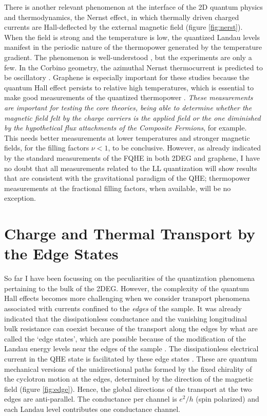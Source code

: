 \documentclass[aps,preprint,12pt,tightenlines]{revtex4}%
\begin{document}
There is another relevant phenomenon at the interface of the 2D quantum
physics and thermodynamics, the Nernst effect, in which thermally driven
charged currents are Hall-deflected by the external magnetic field (figure \ref{fig:nerst}). When the
field is strong and the temperature is low, the quantized Landau levels
manifest in the periodic nature of the thermopower generated by the
temperature gradient. The phenomenon is well-understood \cite{Girvin-Nernst},
but the experiments are only a few. In the Corbino geometry, the azimuthal
Nernst thermocurrent is predicted to be oscillatory \cite{Alt-PNAS}. Graphene
is especially important for these studies because the quantum Hall effect
persists to relative high temperatures, which is essential to make good
measurements of the quantized thermopower \cite{Zuev-graph,Wei-graph}.
\emph{These measurements are important for testing the core theories, being
able to determine whether the magnetic field felt by the charge carriers is
the applied field or the one diminished by the hypothetical flux attachments
of the Composite Fermions}, for example. This needs better measurements at
lower temperatures and stronger magnetic fields, for the filling factors
$\nu<1$, to be conclusive. However, as already indicated by the standard
measurements of the FQHE in both 2DEG and graphene, I have no doubt that all
measurements related to the LL quantization will show results that
are consistent with the gravitational paradigm of the QHE; thermopower
measurements at the fractional filling factors, when available, will be no exception.

\section{Charge and Thermal Transport by the Edge States}

So far I have been focussing on the peculiarities of the quantization
phenomena pertaining to the bulk of the 2DEG. However, the complexity of the
quantum Hall effects becomes more challenging when we consider transport
phenomena associated with currents confined to the \emph{edges} of the sample.
It was already indicated that the dissipationless conductance and the
vanishing longitudinal bulk resistance can coexist because of the transport
along the edges by what are called the `edge states', which are possible
because of the modification of the Landau energy levels near the edges of the
sample \cite{Halperin-edge}.  The dissipationless electrical current in the
QHE state is facilitated by these edge states \cite{Kane-edge}. These are
quantum mechanical versions of the unidirectional paths formed by the fixed
chirality of the cyclotron motion at the edges, determined by the direction of
the magnetic field (figure \ref{fig:edge}). Hence, the global directions of
the transport at the two edges are anti-parallel. The conductance per channel
is $e^{2}/h$ (spin polarized) and each Landau level contributes one
conductance channel.
\end{document}
